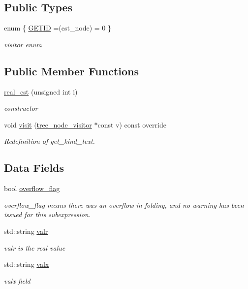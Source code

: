 \subsection*{Public Types}
\begin{DoxyCompactItemize}
\item 
enum \{ \hyperlink{structreal__cst_a300e0077d353566ee30691a50f034a35ac1078aeee8979b474d4d9806c9f80286}{G\+E\+T\+ID} =(cst\+\_\+node) = 0
 \}\begin{DoxyCompactList}\small\item\em visitor enum \end{DoxyCompactList}
\end{DoxyCompactItemize}
\subsection*{Public Member Functions}
\begin{DoxyCompactItemize}
\item 
\hyperlink{structreal__cst_adf68bd74d76034ba702cec98753d14ad}{real\+\_\+cst} (unsigned int i)
\begin{DoxyCompactList}\small\item\em constructor \end{DoxyCompactList}\item 
void \hyperlink{structreal__cst_ae6808fef9486f7f044fde5befedf425a}{visit} (\hyperlink{classtree__node__visitor}{tree\+\_\+node\+\_\+visitor} $\ast$const v) const override
\begin{DoxyCompactList}\small\item\em Redefinition of get\+\_\+kind\+\_\+text. \end{DoxyCompactList}\end{DoxyCompactItemize}
\subsection*{Data Fields}
\begin{DoxyCompactItemize}
\item 
bool \hyperlink{structreal__cst_a10a2893a80eb0e02d8c7c21195d27971}{overflow\+\_\+flag}
\begin{DoxyCompactList}\small\item\em overflow\+\_\+flag means there was an overflow in folding, and no warning has been issued for this subexpression. \end{DoxyCompactList}\item 
std\+::string \hyperlink{structreal__cst_a1d475cc5d74e81b5e7ea489f6b79b29d}{valr}
\begin{DoxyCompactList}\small\item\em valr is the real value \end{DoxyCompactList}\item 
std\+::string \hyperlink{structreal__cst_a75735bcb8dcc50f7c237a5daa7a1dffc}{valx}
\begin{DoxyCompactList}\small\item\em valx field \end{DoxyCompactList}\end{DoxyCompactItemize}

